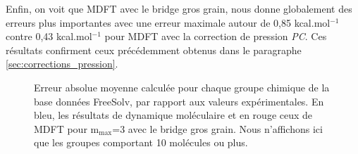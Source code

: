 Enfin, on voit que MDFT avec le bridge gros grain, nous donne globalement des erreurs plus importantes avec une erreur maximale autour de 0,85 kcal.mol$^{-1}$ contre 0,43 kcal.mol$^{-1}$ pour MDFT avec la correction de pression \textit{PC}. Ces résultats confirment ceux précédemment obtenus dans le paragraphe \ref{sec:corrections_pression}. 


\begin{figure}[ht]
  \centering
  \caption[Erreur absolue moyenne pour chaque groupe chimique de la base données FreeSolv calculée par MDFT avec le bridge gros grain.]{Erreur absolue moyenne calculée pour chaque groupe chimique de la base données FreeSolv, par rapport aux valeurs expérimentales. En bleu, les résultats de dynamique moléculaire et en rouge ceux de MDFT pour $\mathrm{m}_\mathrm{max}$=3 avec le bridge gros grain. Nous n'affichons ici que les groupes comportant 10 molécules ou plus.}
  \label{fig:AUE:mmax3_cgb}
\end{figure}

